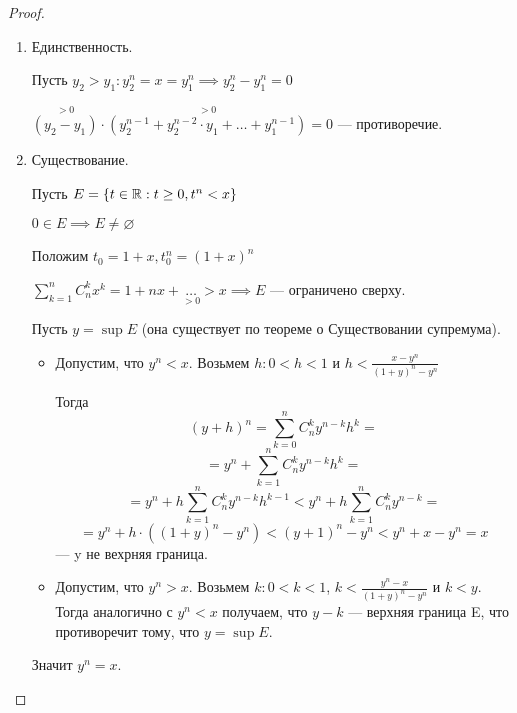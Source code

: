 \begin{proof}
    \begin{enumerate}
        \item Единственность.
        
        Пусть $y_2 > y_1: y^{n}_{2} = x = y^{n}_{1} \implies y^{n}_{2} - y^{n}_{1} = 0$

        $\overset{> 0}{(y_2 - y_1)} \cdot \overset{> 0}{(y^{n-1}_{2} + y^{n-2}_{2} \cdot y_1 + \ldots + y^{n-1}_{1})} = 0$ --- противоречие.


        \item Существование.
        
        Пусть $E = \{t \in \mathbb{R}: t \geq 0, t^n < x\}$

        $0 \in E \implies E \neq \varnothing$

        Положим $t_0 = 1 + x, t_{0}^{n} = (1 + x)^n$

        $\sum_{k = 1}^{n} C_{n}^{k} x^k = 1 + nx + \underset{> 0}{\dots} > x \implies E$ --- ограничено сверху.

        Пусть $y = \sup E$ (она существует по теореме о Существовании супремума). 
        
        \begin{itemize}
        
            \item Допустим, что $y^n < x$. Возьмем $h: 0 < h < 1$ и $h < \frac{x - y^{n}}{(1+y)^{n} - y^n}$
            
            Тогда \[(y + h)^n = \sum^{n}_{k = 0} C_{n}^{k} y^{n - k}h^{k} = \]
            \[ =y^n + \sum^{n}_{k = 1} C_{n}^{k} y^{n - k}h^{k} = \] 
            \[ =y^n + h\sum^{n}_{k = 1} C_{n}^{k} y^{n - k}h^{k-1} < y^n + h \sum_{k = 1}^{n} C_{n}^{k}y^{n-k} = \] 
            \[ =y^n + h \cdot ((1 + y)^n - y^n) <(y + 1)^n - y^n < y^n + x - y^n = x\] --- y не вехрняя граница.

            \item Допустим, что $y^n > x$. Возьмем $k: 0 < k < 1$, 
            $k < \frac{y^{n} - x}{(1 + y)^{n} - y^{n}}$ и  $k < y$. Тогда аналогично с $y^n < x$ получаем, что $y - k$ --- верхняя граница E, что противоречит тому, что $y = \sup E$. 
        \end{itemize}
        Значит $y^n = x$.
    \end{enumerate}
\end{proof}